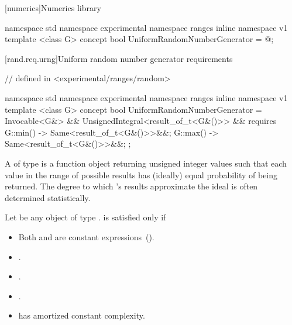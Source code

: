 [numerics]{Numerics library}


\begin{codeblock}
namespace std { namespace experimental { namespace ranges { inline namespace v1 {
  template <class G>
  concept bool UniformRandomNumberGenerator = @\seebelow@;
}}}}
\end{codeblock}


[rand.req.urng]{Uniform random number generator requirements}%
%

\begin{codeblock}
// defined in <experimental/ranges/random>

namespace std { namespace experimental { namespace ranges { inline namespace v1 {
  template <class G>
  concept bool UniformRandomNumberGenerator =
    Invocable<G&> &&
    UnsignedIntegral<result_of_t<G&()>> &&
    requires {
      { G::min() } -> Same<result_of_t<G&()>>&&;
      { G::max() } -> Same<result_of_t<G&()>>&&;
    };
}}}}
\end{codeblock}

\pnum
A 
 of type 
is a function object
returning unsigned integer values
such that each value
in the range of possible results
has (ideally) equal probability
of being returned.
\enternote
 The degree to which 's results
 approximate the ideal
 is often determined statistically.
\exitnote

\pnum
Let  be any object of type .
 is satisfied only if

\begin{itemize}
\item Both  and  are constant expressions~().
\item {}.
\item {}.
\item {}.
\item {} has amortized constant complexity.
\end{itemize}
